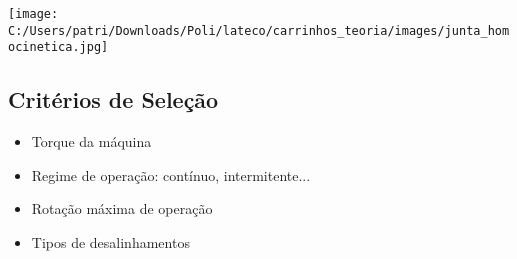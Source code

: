 \begin{namedtheorem}

	\begin{center}
	\texttt{[image: C:/Users/patri/Downloads/Poli/lateco/carrinhos\_teoria/images/junta\_homocinetica.jpg]}
	\end{center}		

\end{namedtheorem}

\subsection{Critérios de Seleção}

\begin{itemize}
	\item Torque da máquina
	\item Regime de operação: contínuo, intermitente...
	\item Rotação máxima de operação
	\item Tipos de desalinhamentos
\end{itemize}










